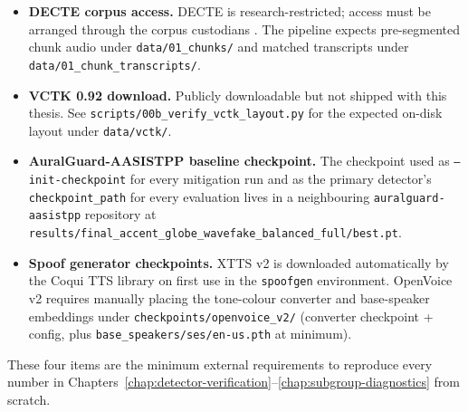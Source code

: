 \begin{itemize}
    \item \textbf{DECTE corpus access.} DECTE is research-restricted; access
        must be arranged through the corpus custodians \cite{Corrigan_DECTE}.
        The pipeline expects pre-segmented chunk audio under
        \texttt{data/01\_chunks/} and matched transcripts under
        \texttt{data/01\_chunk\_transcripts/}.
    \item \textbf{VCTK 0.92 download.} Publicly downloadable but not shipped
        with this thesis. See \texttt{scripts/00b\_verify\_vctk\_layout.py} for the
        expected on-disk layout under \texttt{data/vctk/}.
    \item \textbf{AuralGuard-AASISTPP baseline checkpoint.} The checkpoint used
        as \texttt{--init-checkpoint} for every mitigation run and as the primary
        detector's \texttt{checkpoint\_path} for every evaluation lives in a
        neighbouring \texttt{auralguard-aasistpp} repository at
        \texttt{results/}\allowbreak\texttt{final\_accent\_globe\_wavefake\_balanced\_full/}\allowbreak\texttt{best.pt}.
    \item \textbf{Spoof generator checkpoints.} XTTS v2 is downloaded
        automatically by the Coqui TTS library on first use in the
        \texttt{spoofgen} environment. OpenVoice v2 requires manually placing the
        tone-colour converter and base-speaker embeddings under
        \texttt{checkpoints/openvoice\_v2/} (converter checkpoint + config, plus
        \texttt{base\_speakers/ses/en-us.pth} at minimum).
\end{itemize}

These four items are the minimum external requirements to reproduce
every number in Chapters~\ref{chap:detector-verification}--\ref{chap:subgroup-diagnostics}
from scratch.
